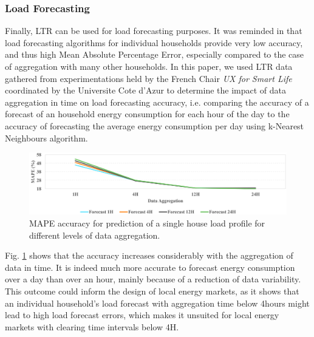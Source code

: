 \documentclass[conference]{IEEEtran}
\begin{document}
\subsubsection{Load Forecasting}
Finally, LTR can be used for load forecasting purposes. It was reminded in \cite{IEEE:ReviewSmartMeterData} that load forecasting algorithms for individual households provide very low accuracy, and thus high Mean Absolute Percentage Error, especially compared to the case of aggregation with many other households. In this paper, we used LTR data gathered from experimentations held by the French Chair \textit{UX for Smart Life} coordinated by the Universite Cote d'Azur to determine the impact of data aggregation in time on load forecasting accuracy, i.e. comparing the accuracy of a forecast of an household energy consumption for each hour of the day to the accuracy of forecasting the average energy consumption per day using k-Nearest Neighbours algorithm.

\begin{figure}[h]
\centering
\includegraphics[width=1\columnwidth]{Images/ForecastAccuracy.png}
\caption{MAPE accuracy for prediction of a single house load profile for different levels of data aggregation.}
\label{Fig:ForecastAccuracy}
\end{figure}
Fig. \ref{Fig:ForecastAccuracy} shows that the accuracy increases considerably with the aggregation of data in time. It is indeed much more accurate to forecast energy consumption over a day than over an hour, mainly because of a reduction of data variability. This outcome could inform the design of local energy markets, as it shows that an individual household's load forecast with aggregation time below 4hours might lead to high load forecast errors, which makes it unsuited for local energy markets with clearing time intervals below 4H.  
\end{document}
